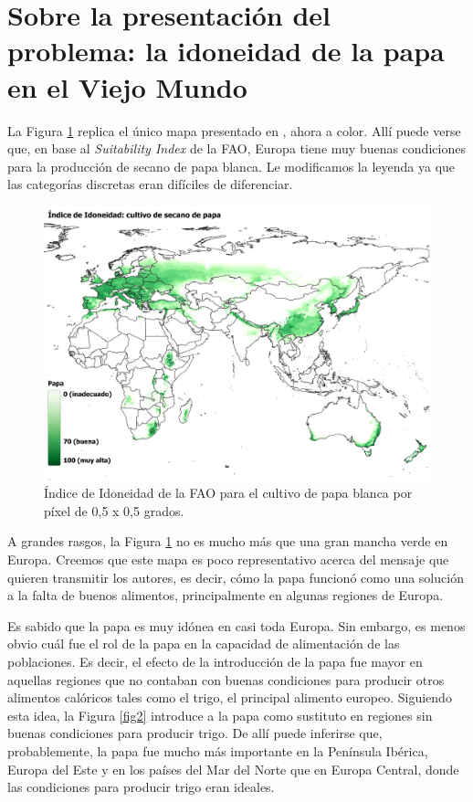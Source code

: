 \documentclass[10.5pt]{article}   %
\begin{document}
\section*{Sobre la presentación del problema: la idoneidad de la papa en el Viejo Mundo}
La Figura \ref{fig1} replica el único mapa presentado en \cite{nunn2011potato}, ahora a color. Allí puede verse que, en base al \textit{Suitability Index} de la FAO, Europa tiene muy buenas condiciones para la producción de secano de papa blanca. Le modificamos la leyenda ya que las categorías discretas eran difíciles de diferenciar.

\begin{figure}[H]
\centering
\includegraphics[scale=0.6]{imgs/wpot.png}
\caption{Índice de Idoneidad de la FAO para el cultivo de papa blanca por píxel de 0,5 x 0,5 grados.}
    \label{fig1}
\end{figure}

A grandes rasgos, la Figura \ref{fig1} no es mucho más que una gran mancha verde en Europa. Creemos que este mapa es poco representativo acerca del mensaje que quieren transmitir los autores, es decir, cómo la papa funcionó como una solución a la falta de buenos alimentos, principalmente en algunas regiones de Europa.  

Es sabido que la papa es muy idónea en casi toda Europa. Sin embargo, es menos obvio cuál fue el rol de la papa en la capacidad de alimentación de las poblaciones. Es decir, el efecto de la introducción de la papa fue mayor en aquellas regiones que no contaban con buenas condiciones para producir otros alimentos calóricos tales como el trigo, el principal alimento europeo. 
Siguiendo esta idea, la  Figura \ref{fig2} introduce a la papa como sustituto en regiones sin buenas condiciones para producir trigo. De allí puede inferirse que, probablemente, la papa fue mucho más importante en la Península Ibérica, Europa del Este y en los países del Mar del Norte que en Europa Central, donde las condiciones para producir trigo eran ideales.  
\end{document}
